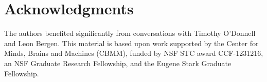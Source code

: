 \documentclass[10pt,letterpaper]{article}
\begin{document}

\section{Acknowledgments}

The authors benefited significantly from conversations with Timothy
O'Donnell and Leon Bergen. This material is based upon work supported
by the Center for Minds, Brains and Machines (CBMM), funded by NSF STC
award CCF-1231216, an NSF Graduate Research Fellowship, and the Eugene
Stark Graduate Fellowship.




\setlength{\bibleftmargin}{.125in}
\setlength{\bibindent}{-\bibleftmargin}

\end{document}
